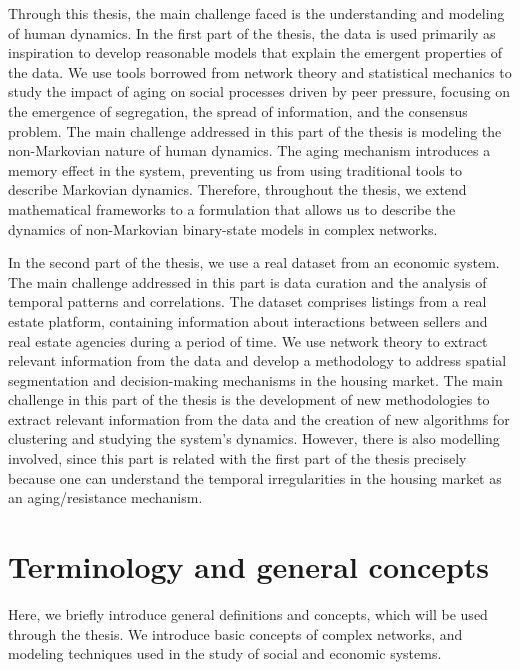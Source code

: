 Through this thesis, the main challenge faced is the understanding and modeling of human dynamics. In the first part of the thesis, the data is used primarily as inspiration to develop reasonable models that explain the emergent properties of the data. We use tools borrowed from network theory and statistical mechanics to study the impact of aging on social processes driven by peer pressure, focusing on the emergence of segregation, the spread of information, and the consensus problem. The main challenge addressed in this part of the thesis is modeling the non-Markovian nature of human dynamics. The aging mechanism introduces a memory effect in the system, preventing us from using traditional tools to describe Markovian dynamics. Therefore, throughout the thesis, we extend mathematical frameworks to a formulation that allows us to describe the dynamics of non-Markovian binary-state models in complex networks.

In the second part of the thesis, we use a real dataset from an economic system. The main challenge addressed in this part is data curation and the analysis of temporal patterns and correlations. The dataset comprises listings from a real estate platform, containing information about interactions between sellers and real estate agencies during a period of time. We use network theory to extract relevant information from the data and develop a methodology to address spatial segmentation and decision-making mechanisms in the housing market. The main challenge in this part of the thesis is the development of new methodologies to extract relevant information from the data and the creation of new algorithms for clustering and studying the system's dynamics. However, there is also modelling involved, since this part is related with the first part of the thesis precisely because one can understand the temporal irregularities in the housing market as an aging/resistance mechanism.

\section{\label{sec:Terminology and general concepts} Terminology and general concepts}

Here, we briefly introduce general definitions and concepts, which will be used through the thesis. We introduce basic concepts of complex networks, and modeling techniques used in the study of social and economic systems.
